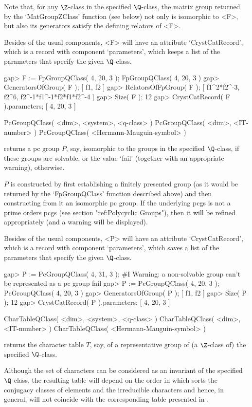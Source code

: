 Note that, for any $\Z$-class  in the  specified $\Q$-class,  the  matrix
group  returned by the `MatGroupZClass'  function (see below) not only is
isomorphic to <F>, but also its  generators satisfy the defining relators
of <F>.

Besides  of the usual components,  <F> will have an attribute
`CrystCatRecord', which is a record with component
`parameters', which keeps a list of the parameters
that specify the given $\Q$-class.

\beginexample
gap> F := FpGroupQClass( 4, 20, 3 );
FpGroupQClass( 4, 20, 3 )
gap> GeneratorsOfGroup( F );
[ f1, f2 ]
gap> RelatorsOfFpGroup( F );
[ f1^2*f2^-3, f2^6, f2^-1*f1^-1*f2*f1*f2^-4 ]
gap> Size( F );
12
gap> CrystCatRecord( F ).parameters;
[ 4, 20, 3 ]
\endexample

\>PcGroupQClass( <dim>, <system>, <q-class> )
\>PcGroupQClass( <dim>, <IT-number> )
\>PcGroupQClass( <Hermann-Mauguin-symbol> )

returns a pc group $P$, say, isomorphic to the groups in the
specified $\Q$-class, if these groups are solvable, or the value
`fail' (together with an appropriate warning), otherwise.

$P$ is constructed by first establishing a finitely presented group
(as it would be returned by the `FpGroupQClass' function described
above) and then constructing from it an isomorphic pc group.  If the
underlying pcgs is not a prime orders pcgs (see section "ref:Polycyclic
Groups"), then it will be refined appropriately (and a warning will 
be displayed).

Besides of the usual components, <P> will have an attribute
`CrystCatRecord', which is a record with component
`parameters', which saves a list of the parameters that specify 
the given $\Q$-class.

\beginexample
gap> P := PcGroupQClass( 4, 31, 3 );
#I  Warning: a non-solvable group can't be represented as a pc group
fail
gap> P := PcGroupQClass( 4, 20, 3 );
PcGroupQClass( 4, 20, 3 )
gap> GeneratorsOfGroup( P );
[ f1, f2 ]
gap> Size( P );
12
gap> CrystCatRecord( P ).parameters;
[ 4, 20, 3 ]
\endexample

\>CharTableQClass( <dim>, <system>, <q-class> )
\>CharTableQClass( <dim>, <IT-number> )
\>CharTableQClass( <Hermann-Mauguin-symbol> )

returns the character table $T$, say, of a representative group of (a
$\Z$-class of) the specified $\Q$-class.

Although the set of characters  can be considered as  an invariant of the
specified $\Q$-class,  the resulting  table  will depend on  the order in
which {\GAP} sorts the conjugacy classes of  elements and the irreducible
characters  and    hence,  in  general,   will  not   coincide  with  the
corresponding table presented in \cite{BBNWZ78}.

